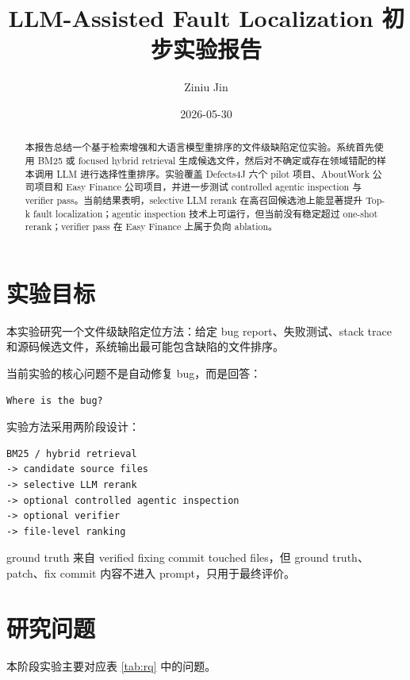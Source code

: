 \documentclass[12pt,a4paper]{ctexart}
\title{LLM-Assisted Fault Localization 初步实验报告}
\author{Ziniu Jin}
\date{2026-05-30}
\begin{document}
\maketitle

\begin{abstract}
本报告总结一个基于检索增强和大语言模型重排序的文件级缺陷定位实验。系统首先使用 BM25 或 focused hybrid retrieval 生成候选文件，然后对不确定或存在领域错配的样本调用 LLM 进行选择性重排序。实验覆盖 Defects4J 六个 pilot 项目、AboutWork 公司项目和 Easy Finance 公司项目，并进一步测试 controlled agentic inspection 与 verifier pass。当前结果表明，selective LLM rerank 在高召回候选池上能显著提升 Top-k fault localization；agentic inspection 技术上可运行，但当前没有稳定超过 one-shot rerank；verifier pass 在 Easy Finance 上属于负向 ablation。
\end{abstract}

\tableofcontents
\newpage

\section{实验目标}

本实验研究一个文件级缺陷定位方法：给定 bug report、失败测试、stack trace 和源码候选文件，系统输出最可能包含缺陷的文件排序。

当前实验的核心问题不是自动修复 bug，而是回答：

\begin{lstlisting}
Where is the bug?
\end{lstlisting}

实验方法采用两阶段设计：

\begin{lstlisting}
BM25 / hybrid retrieval
-> candidate source files
-> selective LLM rerank
-> optional controlled agentic inspection
-> optional verifier
-> file-level ranking
\end{lstlisting}

ground truth 来自 verified fixing commit touched files，但 ground truth、patch、fix commit 内容不进入 prompt，只用于最终评价。

\section{研究问题}

本阶段实验主要对应表 \ref{tab:rq} 中的问题。
\end{document}
